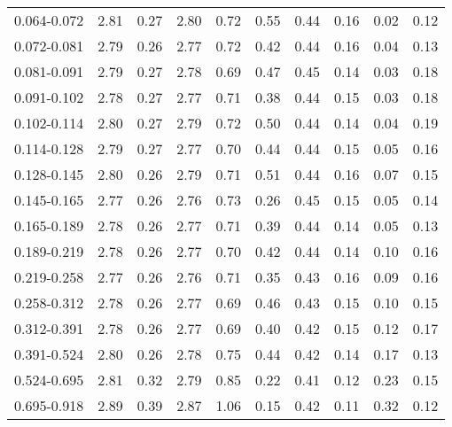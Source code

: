 \begin{table}
\begin{center}
\begin{tabular}{@{}l l l l l l l l l l@{}}
            0.064-0.072     &  2.81   &  0.27   &  2.80         &  0.72      &  0.55    &  0.44  &  0.16       &  0.02  &  0.12  \\
            0.072-0.081     &  2.79   &  0.26   &  2.77         &  0.72      &  0.42    &  0.44  &  0.16       &  0.04  &  0.13  \\
            0.081-0.091     &  2.79   &  0.27   &  2.78         &  0.69      &  0.47    &  0.45  &  0.14       &  0.03  &  0.18  \\
            0.091-0.102     &  2.78   &  0.27   &  2.77         &  0.71      &  0.38    &  0.44  &  0.15       &  0.03  &  0.18  \\
            0.102-0.114     &  2.80   &  0.27   &  2.79         &  0.72      &  0.50    &  0.44  &  0.14       &  0.04  &  0.19  \\
            0.114-0.128     &  2.79   &  0.27   &  2.77         &  0.70      &  0.44    &  0.44  &  0.15       &  0.05  &  0.16  \\
            0.128-0.145     &  2.80   &  0.26   &  2.79         &  0.71      &  0.51    &  0.44  &  0.16       &  0.07  &  0.15  \\
            0.145-0.165     &  2.77   &  0.26   &  2.76         &  0.73      &  0.26    &  0.45  &  0.15       &  0.05  &  0.14  \\
            0.165-0.189     &  2.78   &  0.26   &  2.77         &  0.71      &  0.39    &  0.44  &  0.14       &  0.05  &  0.13  \\
            0.189-0.219     &  2.78   &  0.26   &  2.77         &  0.70      &  0.42    &  0.44  &  0.14       &  0.10  &  0.16  \\
            0.219-0.258     &  2.77   &  0.26   &  2.76         &  0.71      &  0.35    &  0.43  &  0.16       &  0.09  &  0.16  \\
            0.258-0.312     &  2.78   &  0.26   &  2.77         &  0.69      &  0.46    &  0.43  &  0.15       &  0.10  &  0.15  \\
            0.312-0.391     &  2.78   &  0.26   &  2.77         &  0.69      &  0.40    &  0.42  &  0.15       &  0.12  &  0.17  \\
            0.391-0.524     &  2.80   &  0.26   &  2.78         &  0.75      &  0.44    &  0.42  &  0.14       &  0.17  &  0.13  \\
            0.524-0.695     &  2.81   &  0.32   &  2.79         &  0.85      &  0.22    &  0.41  &  0.12       &  0.23  &  0.15  \\
            0.695-0.918     &  2.89   &  0.39   &  2.87         &  1.06      &  0.15    &  0.42  &  0.11       &  0.32  &  0.12  \\

\end{tabular}
\end{center}
\end{table}
